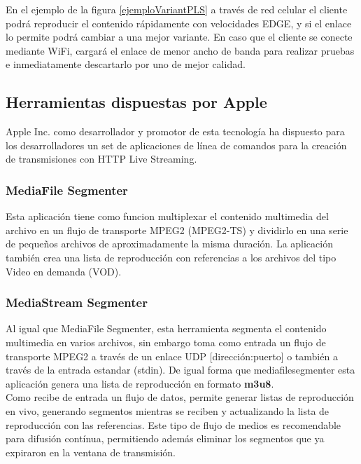 En el ejemplo de la figura \ref{ejemploVariantPLS} a través de red celular el cliente podrá reproducir el contenido rápidamente con velocidades EDGE, y si el enlace lo permite podrá cambiar a una mejor variante. En caso que el cliente se conecte mediante WiFi, cargará el enlace de menor ancho de banda para realizar pruebas e inmediatamente descartarlo por uno de mejor calidad.




	\subsection{Herramientas dispuestas por Apple}
	Apple Inc. como desarrollador y promotor de esta tecnología ha dispuesto para los desarrolladores un set de aplicaciones de línea de comandos para la creación de transmisiones con HTTP Live Streaming.
		\subsubsection{MediaFile Segmenter}
Esta aplicación tiene como funcion multiplexar el contenido multimedia del archivo en un flujo de transporte MPEG2 (MPEG2-TS) y dividirlo en una serie de pequeños archivos de aproximadamente la misma duración. La aplicación también crea una lista de reproducción con referencias a los archivos del tipo Video en demanda (VOD).

		\subsubsection{MediaStream Segmenter}
Al igual que MediaFile Segmenter, esta herramienta segmenta el contenido multimedia en varios archivos, sin embargo toma como entrada un flujo de transporte MPEG2 a través de un enlace UDP [dirección:puerto] o también a través de la entrada estandar (stdin). De igual forma que mediafilesegmenter esta aplicación genera una lista de reproducción en formato \textbf{m3u8}.\\

Como recibe de entrada un flujo de datos, permite generar listas de reproducción en vivo, generando segmentos mientras se reciben y actualizando la lista de reproducción con las referencias. Este tipo de flujo de medios es recomendable para difusión contínua, permitiendo además eliminar los segmentos que ya expiraron en la ventana de transmisión.

